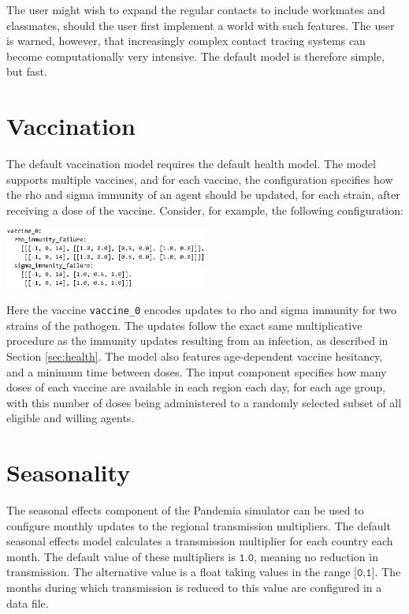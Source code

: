 \documentclass[10pt,letterpaper]{article}
\begin{document}
The user might wish to expand the regular contacts to include workmates and classmates, should the user first implement a world with such features. The user is warned, however, that increasingly complex contact tracing systems can become computationally very intensive. The default model is therefore simple, but fast.

\section{Vaccination}

The default vaccination model requires the default health model. The model supports multiple vaccines, and for each vaccine, the configuration specifies how the rho and sigma immunity of an agent should be updated, for each strain, after receiving a dose of the vaccine. Consider, for example, the following configuration:
\begin{center}
\includegraphics[width=0.5\textwidth]{codeexample2bw}
\end{center}
Here the vaccine \texttt{vaccine{\_0}} encodes updates to rho and sigma immunity for two strains of the pathogen. The updates follow the exact same multiplicative procedure as the immunity updates resulting from an infection, as described in Section \ref{sec:health}. The model also features age-dependent vaccine hesitancy, and a minimum time between doses. The input component specifies how many doses of each vaccine are available in each region each day, for each age group, with this number of doses being administered to a randomly selected subset of all eligible and willing agents.

\section{Seasonality}

The seasonal effects component of the Pandemia simulator can be used to configure monthly updates to the regional transmission multipliers. The default seasonal effects model calculates a transmission multiplier for each country each month. The default value of these multipliers is $\texttt{1.0}$, meaning no reduction in transmission. The alternative value is a float taking values in the range $\texttt{[0,1]}$. The months during which transmission is reduced to this value are configured in a data file.
\end{document}
